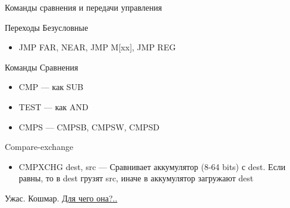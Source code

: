 \documentclass[xetex,aspectratio=43]{beamer}
\begin{document}
\begin{frame}{Команды сравнения и передачи управления}
    \begin{block}{Переходы Безусловные}
        \begin{itemize}
            \tightlist
            \item
            JMP FAR, NEAR, JMP M{[}xx{]}, JMP REG
        \end{itemize}
    \end{block}

    \begin{block}{Команды Сравнения}
        \begin{itemize}
            \item
            CMP --- как SUB
            \item
            TEST --- как AND
            \item
            CMPS --- CMPSB, CMPSW, CMPSD
        \end{itemize}

        \pause

        Compare-exchange
        \begin{itemize}
            \tightlist
            \item
            CMPXCHG dest, src --- Сравнивает аккумулятор (8-64 bits) с dest. Если
            равны, то в dest грузят src, иначе в аккумулятор загружают dest
        \end{itemize}

        \pause

        Ужас. Кошмар.
        \href{https://ru.wikipedia.org/wiki/\%D0\%A1\%D1\%80\%D0\%B0\%D0\%B2\%D0\%BD\%D0\%B5\%D0\%BD\%D0\%B8\%D0\%B5_\%D1\%81_\%D0\%BE\%D0\%B1\%D0\%BC\%D0\%B5\%D0\%BD\%D0\%BE\%D0\%BC\#\%D0\%97\%D0\%B0\%D1\%87\%D0\%B5\%D0\%BC_\%D1\%8D\%D1\%82\%D0\%BE_\%D0\%BD\%D1\%83\%D0\%B6\%D0\%BD\%D0\%BE}{Для чего она?..}
    \end{block}
\end{frame}
\end{document}
